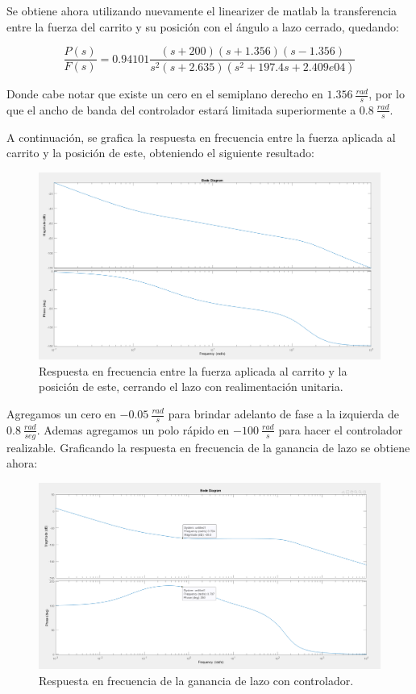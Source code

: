 Se obtiene ahora utilizando nuevamente el linearizer de matlab la transferencia entre la fuerza del carrito y su posición con el ángulo a lazo cerrado, quedando:

\begin{equation}
\frac{P(s)}{F(s)} = 0.94101\frac{(s+200)(s+1.356)(s-1.356)}{s^2(s+2.635)(s^2 + 197.4s + 2.409e04)}
\end{equation}

Donde cabe notar que existe un cero en el semiplano derecho en $1.356 \ \frac{rad}{s}$, por lo que el ancho de banda del controlador estará limitada superiormente a $0.8 \ \frac{rad}{s}$.

A continuación, se grafica la respuesta en frecuencia entre la fuerza aplicada al carrito y la posición de este, obteniendo el siguiente resultado:

\begin{figure}[H]
	\centering
	\includegraphics[width=0.8\linewidth]{Imagenes/loopshaping/bode_cerrando_p}
	\caption{Respuesta en frecuencia entre la fuerza aplicada al carrito y la posición de este, cerrando el lazo con realimentación unitaria.}
	\label{bode_cerrando_p}
\end{figure}

Agregamos un cero en $-0.05 \ \frac{rad}{s}$ para brindar adelanto de fase a la izquierda de $0.8 \ \frac{rad}{seg}$. Ademas agregamos un polo rápido en $-100 \ \frac{rad}{s}$ para hacer el controlador realizable. Graficando la respuesta en frecuencia de la ganancia de lazo se obtiene ahora:

\begin{figure}[H]
	\centering
	\includegraphics[width=0.8\linewidth]{Imagenes/loopshaping/bode_cerrando_p_con_controlador}
	\caption{Respuesta en frecuencia de la ganancia de lazo con controlador.}
	\label{bode_cerrando_p_con_controlador}
\end{figure}

